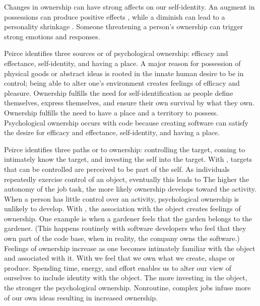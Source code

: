 Changes in ownership can have strong affects on our self-identity. An augment in possessions can produce positive effects \cite{Formanek1994}, while a diminish can lead to a personality shrinkage \cite{James1890}. Someone threatening a person’s ownership can trigger strong emotions and responses.

Peirce identifies three sources or  of psychological ownership: efficacy and effectance, self-identity, and having a place. A major reason for possession of physical goods or abstract ideas is rooted in the innate human desire to be in control; being able to alter one’s environment creates feelings of efficacy and pleasure. Ownership fulfills the need for self-identification as people define themselves, express themselves, and ensure their own survival by what they own. Ownership fulfills the need to have a place and a territory to possess.  Psychological ownership occurs with code because creating software can satisfy the desire for efficacy and effectance, self-identity, and having a place.

Peirce identifies three paths or  to ownership: controlling the target, coming to intimately know the target, and investing the self into the target. With , targets that can be controlled are perceived to be part of the self.  As  individuals repeatedly exercise control of an object, eventually this leads to  The higher the autonomy of the job task, the more likely ownership develops toward the activity. When a person has little control over an activity, psychological ownership is unlikely to develop. With , the association with the object creates feelings of ownership. One example is when a gardener feels that the garden belongs to the gardener. (This happens routinely with software developers who feel that they own part of the code base, when in reality, the company owns the software.) Feelings of ownership increase as one becomes intimately familiar with the object and associated with it. With  we feel that we own what we create, shape or produce. Spending time, energy, and effort enables us to alter our view of ourselves to include identity with the object. The more investing in the object, the stronger the psychological ownership. Nonroutine, complex jobs infuse more of our own ideas resulting in increased ownership.

